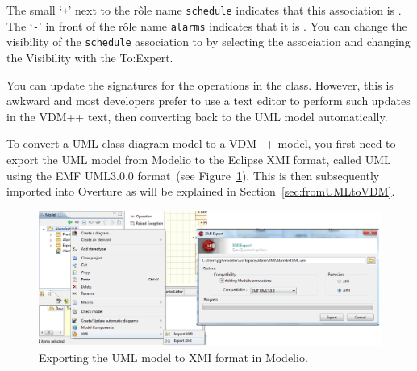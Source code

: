 The small `\texttt{+}' next to the r\^{o}le name \texttt{schedule}
indicates that this association is . The `\texttt{-}' in
front of the r\^{o}le name \texttt{alarms} indicates that it is
. You can change the visibility of the
\texttt{schedule} association to  by selecting the
association and changing the \textsf{Visibility} with the
\textsf{To:Expert}.

You can update the signatures for the operations in the
 class. However, this is awkward and most developers
prefer to use a text editor to perform such updates in the VDM++ text, then converting back to the
UML model automatically.

To convert a UML class diagram model to a VDM++ model, you first need
to export the UML model from Modelio to the Eclipse XMI format, called UML using the EMF UML3.0.0 format~(see Figure~\ref{fig:xmiexportmodelio}). This
is then subsequently imported into Overture as will be explained in Section~\ref{sec:fromUMLtoVDM}.

\begin{figure}[htbp]
\begin{center}
\includegraphics[width=4.5in]{figures/xmiexportmodelio}
\caption{Exporting the UML model to XMI format in Modelio.\label{fig:xmiexportmodelio}}
\end{center}
\end{figure}



